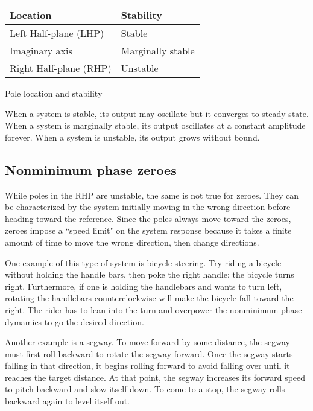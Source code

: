 \begin{booktable}
  \begin{tabular}{|ll|}
    \hline
    \rowcolor{headingbg}
    \textbf{Location} & \textbf{Stability} \\
    \hline
    Left Half-plane (LHP) & Stable \\
    Imaginary axis & Marginally stable \\
    Right Half-plane (RHP) & Unstable \\
    \hline
  \end{tabular}

  \caption{Pole location and stability}
  \label{tab:pole_locations}
\end{booktable}

When a \gls{system} is stable, its output may oscillate but it converges to
steady-state. When a \gls{system} is marginally stable, its output oscillates at
a constant amplitude forever. When a \gls{system} is unstable, its output grows
without bound.

\subsection{Nonminimum phase zeroes}

While poles in the RHP are unstable, the same is not true for zeroes. They can
be characterized by the \gls{system} initially moving in the wrong direction
before heading toward the \gls{reference}. Since the poles always move toward
the zeroes, zeroes impose a ``speed limit" on the \gls{system response} because
it takes a finite amount of time to move the wrong direction, then change
directions.

One example of this type of \gls{system} is bicycle steering. Try riding a
bicycle without holding the handle bars, then poke the right handle; the bicycle
turns right. Furthermore, if one is holding the handlebars and wants to turn
left, rotating the handlebars counterclockwise will make the bicycle fall toward
the right. The rider has to lean into the turn and overpower the nonminimum
phase dymamics to go the desired direction.

Another example is a segway. To move forward by some distance, the segway must
first roll backward to rotate the segway forward. Once the segway starts falling
in that direction, it begins rolling forward to avoid falling over until
it reaches the target distance. At that point, the segway increases its forward
speed to pitch backward and slow itself down. To come to a stop, the segway
rolls backward again to level itself out.

